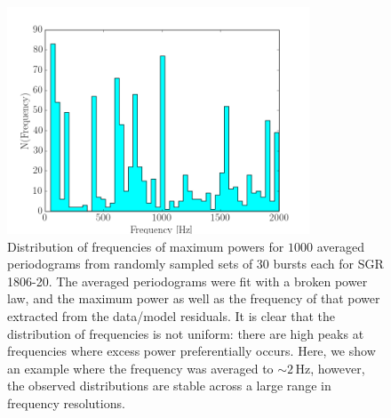 \documentclass[numberedappendix]{emulateapj}
\newcommand{\hz}{\,\mathrm{Hz}}
\begin{document}
\begin{figure}[htbp]
\begin{center}
\includegraphics[width=9cm]{frequency_dist_example.png}
\caption{Distribution of frequencies of maximum powers for $1000$ averaged periodograms from randomly sampled sets of $30$ bursts each for SGR 1806-20. The averaged periodograms were fit with a broken power law, and the maximum power as well as the frequency of that power extracted from the data/model residuals. It is clear that the distribution of frequencies is not uniform: there are high peaks at frequencies where excess power preferentially occurs.  Here, we show an example where the frequency was averaged to $\sim 2 \hz$, however, the observed distributions are stable across a large range in frequency resolutions.}
\label{fig:psd_avg_freqdist}
\end{center}
\end{figure}
\end{document}

